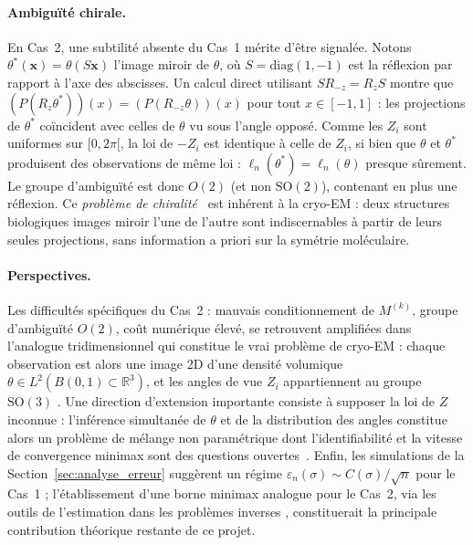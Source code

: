 \documentclass[12pt, a4paper]{article}
\theoremstyle{definition}
\newcommand{\R}{\mathbb{R}}
\begin{document}
\paragraph{Ambiguïté chirale.}
En Cas~2, une subtilité absente du Cas~1 mérite d'être signalée.
Notons $\theta^*(\mathbf{x}) = \theta(S\mathbf{x})$ l'image miroir de $\theta$,
où $S = \mathrm{diag}(1,-1)$ est la réflexion par rapport à l'axe des abscisses.
Un calcul direct utilisant $S R_{-z} = R_z S$ montre que
$(P(R_z\theta^*))(x) = (P(R_{-z}\theta))(x)$ pour tout $x \in [-1,1]$ :
les projections de $\theta^*$ coïncident avec celles de $\theta$ vu sous l'angle
opposé. Comme les $Z_i$ sont uniformes sur $[0,2\pi[$, la loi de $-Z_i$ est
identique à celle de $Z_i$, si bien que $\theta$ et $\theta^*$ produisent des
observations de même loi : $\ell_n(\theta^*) = \ell_n(\theta)$ presque sûrement.
Le groupe d'ambiguïté est donc $O(2)$ (et non $\mathrm{SO}(2)$), contenant en
plus une réflexion. Ce \emph{problème de chiralité}~\cite{frank2006three} est
inhérent à la cryo-EM : deux structures biologiques images miroir l'une de l'autre
sont indiscernables à partir de leurs seules projections, sans information a priori
sur la symétrie moléculaire.

\paragraph{Perspectives.}
Les difficultés spécifiques du Cas~2 : mauvais conditionnement de $M^{(k)}$,
groupe d'ambiguïté $O(2)$, coût numérique élevé, se retrouvent amplifiées
dans l'analogue tridimensionnel qui constitue le vrai problème de cryo-EM :
chaque observation est alors une image 2D d'une densité volumique $\theta \in L^2(B(0,1) \subset \R^3)$,
et les angles de vue $Z_i$ appartiennent au groupe $\mathrm{SO}(3)$
\cite{frank2006three, singer2011three}.
Une direction d'extension importante consiste à supposer la loi de $Z$ inconnue :
l'inférence simultanée de $\theta$ et de la distribution des angles constitue alors
un problème de mélange non paramétrique dont l'identifiabilité et la vitesse
de convergence minimax sont des questions ouvertes~\cite{singer2011three}.
Enfin, les simulations de la Section~\ref{sec:analyse_erreur} suggèrent un régime
$\varepsilon_n(\sigma) \sim C(\sigma)/\sqrt{n}$ pour le Cas~1 ;
l'établissement d'une borne minimax analogue pour le Cas~2, via les outils
de l'estimation dans les problèmes inverses \cite{cavalier2008inverse},
constituerait la principale contribution théorique restante de ce projet.
\end{document}
